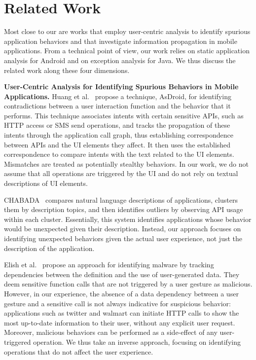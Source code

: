 \section{Related Work}
\label{sec:related}
Most close to our are works that employ user-centric analysis to identify spurious application behaviors and that investigate information propagation in mobile applications.   
From a technical point of view, our work relies on static application analysis for Android and on exception analysis for  Java. 
We thus discuss the related work along these four dimensions. 

\vspace{0.1in}
\noindent 
{\bf User-Centric Analysis for Identifying Spurious Behaviors in Mobile Applications.}
Huang et al.~\cite{Huang:Zhang:Tan:Wang:Liang:ICSE14} propose a technique, AsDroid, for identifying contradictions between a user interaction function and the behavior that it performs. 
This technique associates intents with certain sensitive APIs, such as HTTP access or SMS send operations, and tracks the propagation
of these intents through the application call graph, thus establishing correspondence between APIs and the UI elements they affect. 
It then uses the established correspondence to compare intents with the text related to the UI elements. Mismatches are treated as potentially stealthy behaviors. 
In our work, we do not assume that all operations are triggered by the UI
and do not rely on textual descriptions of UI elements.

CHABADA~\cite{Gorla:Tavecchia:Gross:Zeller:ICSE14} compares natural language descriptions of applications, clusters them by description topics, and then identifies outliers by observing API usage within each cluster. Essentially, this system identifies applications whose behavior would be unexpected given their description. Instead, our approach focuses on identifying unexpected behaviors given the actual user experience, not just the description of the application.

Elish et al.~\cite{Elish:Yao:Ryder:MOST12} propose an approach for identifying malware by tracking dependencies between the definition and the use of user-generated data. They deem sensitive function calls that are not triggered by a user gesture as malicious. However, in our experience, the absence of a data dependency between a user gesture and a sensitive call is not always indicative for suspicious behavior: applications such as twitter and walmart can initiate HTTP calls to show the most up-to-date information to their user, without any explicit user request. Moreover, malicious behaviors can be performed as a side-effect of any user-triggered operation. We thus take an inverse approach, focusing on identifying operations that do not affect the user experience.

